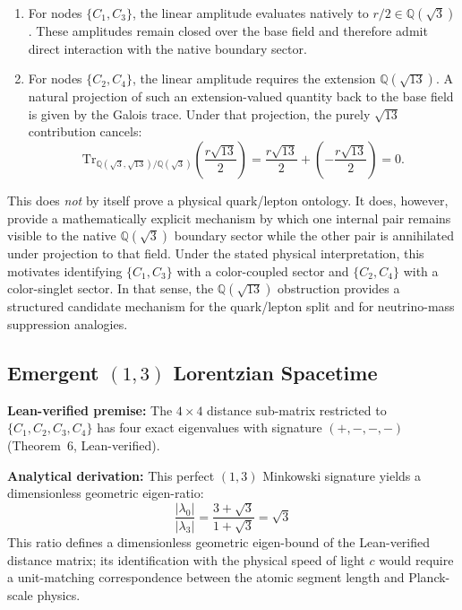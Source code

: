 \documentclass[12pt, a4paper]{article}
\begin{document}
\begin{enumerate}
    \item For nodes $\{C_1, C_3\}$, the linear amplitude evaluates natively to $r/2 \in \mathbb{Q}(\sqrt{3})$. These amplitudes remain closed over the base field and therefore admit direct interaction with the native boundary sector.
    \item For nodes $\{C_2, C_4\}$, the linear amplitude requires the extension $\mathbb{Q}(\sqrt{13})$. A natural projection of such an extension-valued quantity back to the base field is given by the Galois trace. Under that projection, the purely $\sqrt{13}$ contribution cancels:
    \[
    \mathrm{Tr}_{\mathbb{Q}(\sqrt{3},\sqrt{13})/\mathbb{Q}(\sqrt{3})}
    \left(\frac{r\sqrt{13}}{2}\right)
    =
    \frac{r\sqrt{13}}{2}
    +
    \left(-\frac{r\sqrt{13}}{2}\right)
    = 0 .
    \]
\end{enumerate}

This does \emph{not} by itself prove a physical quark/lepton ontology. It does, however, provide a mathematically explicit mechanism by which one internal pair remains visible to the native $\mathbb{Q}(\sqrt{3})$ boundary sector while the other pair is annihilated under projection to that field. Under the stated physical interpretation, this motivates identifying $\{C_1, C_3\}$ with a color-coupled sector and $\{C_2, C_4\}$ with a color-singlet sector. In that sense, the $\mathbb{Q}(\sqrt{13})$ obstruction provides a structured candidate mechanism for the quark/lepton split and for neutrino-mass suppression analogies.

\subsection{Emergent $(1,3)$ Lorentzian Spacetime}

\noindent\textbf{Lean-verified premise:} The $4 \times 4$ distance sub-matrix restricted to $\{C_1, C_2, C_3, C_4\}$ has four exact eigenvalues with signature $(+,-,-,-)$ (Theorem~6, Lean-verified). 

\noindent\textbf{Analytical derivation:} This perfect $(1,3)$ Minkowski signature yields a dimensionless geometric eigen-ratio:
\[ \frac{|\lambda_0|}{|\lambda_3|} = \frac{3+\sqrt{3}}{1+\sqrt{3}} = \sqrt{3} \]
This ratio defines a dimensionless geometric eigen-bound of the Lean-verified distance matrix; its identification with the physical speed of light $c$ would require a unit-matching correspondence between the atomic segment length and Planck-scale physics.
\end{document}

